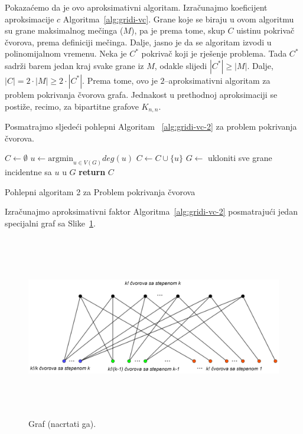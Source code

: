 \documentclass[a4paper, utf8, 11pt, colorlinks]{book}
\begin{document}
  \noindent Pokazaćemo da je ovo aproksimativni algoritam. Izračunajmo koeficijent aproksimacije $c$  Algoritma~\ref{alg:gridi-vc}.
  Grane koje se biraju u ovom algoritmu su grane maksimalnog mečinga ($M$), pa je prema tome, skup $C$ uistinu pokrivač čvorova, prema definiciji mečinga. Dalje, jasno je da se algoritam izvodi u polinomijalnom vremenu. Neka je $C^*$ pokrivač koji je rješenje problema. Tada $C^*$ sadrži barem jedan kraj svake grane iz $M$, odakle slijedi $|C^*|\geq |M|$. Dalje, $|C|= 2 \cdot |M| \geq 2 \cdot |C^*|$. Prema tome, ovo je $2$--aproksimativni algoritam za problem pokrivanja čvorova grafa. Jednakost u prethodnoj aproksimaciji se postiže, recimo, za bipartitne grafove $K_{n,n}$. 
  
  Posmatrajmo sljedeći pohlepni Algoritam ~\ref{alg:gridi-vc-2} za problem pokrivanja čvorova.  
  
  \begin{algorithm}[H] 
  	\begin{algorithmic}[1]
  		\STATE $C \gets \emptyset$
  		\STATE  $u \gets \textrm{argmin}_{u \in V(G)} deg(u)$
  		\STATE  $C \gets C \cup \{u\}$
  		\STATE $G \gets$ ukloniti sve grane incidentne sa $u$ u $G$  
  		\ENDWHILE
  		\STATE \textbf{return} $C$
  	\end{algorithmic}
     	\caption{Pohlepni algoritam 2 za Problem pokrivanja čvorova}
        \label{alg:gridi-vc-2}
  \end{algorithm}
  
  \noindent Izračunajmo aproksimativni faktor Algoritma~\ref{alg:gridi-vc-2} posmatrajući jedan specijalni graf sa Slike~\ref{vertex-cover}. 
  
  
  \begin{figure}
  	\centering
  	\includegraphics[width=120mm,height=80mm]{vc-2-example.eps}
  	\caption{Graf (nacrtati ga).} 
  	\label{vertex-cover}
 
  \end{figure}
  
\end{document}
